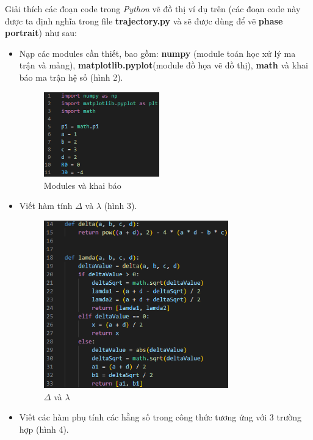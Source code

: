Giải thích các đoạn code trong \textit{Python} vẽ đồ thị ví dụ trên (các đoạn code này được ta định nghĩa trong file \textbf{trajectory.py} và sẽ được dùng để vẽ \textbf{phase portrait}) như sau:
\begin{itemize}
    \item Nạp các modules cần thiết, bao gồm: \textbf{numpy} (module toán học xử lý ma trận và mảng), \textbf{matplotlib.pyplot}(module đồ họa vẽ đồ thị), \textbf{math} và khai báo ma trận hệ số (hình 2).
    \begin{figure}[h!]
        \begin{center}
        \includegraphics[width=5cm]{images/module_param.png}
        \end{center}
        \caption{Modules và khai báo}
    \end{figure}
    \item Viết hàm tính $\Delta$ và $\lambda$ (hình 3).
    \begin{figure}[h!]
        \begin{center}
        \includegraphics[width=8cm]{images/delta_lambda.png}
        \end{center}
        \caption{$\Delta$ và $\lambda$}
    \end{figure}
    \item Viết các hàm phụ tính các hằng số trong công thức tương ứng với 3 trường hợp (hình 4).
    \begin{figure}[h!]
        \begin{center}

\end{center}
\end{figure}
\end{itemize}
